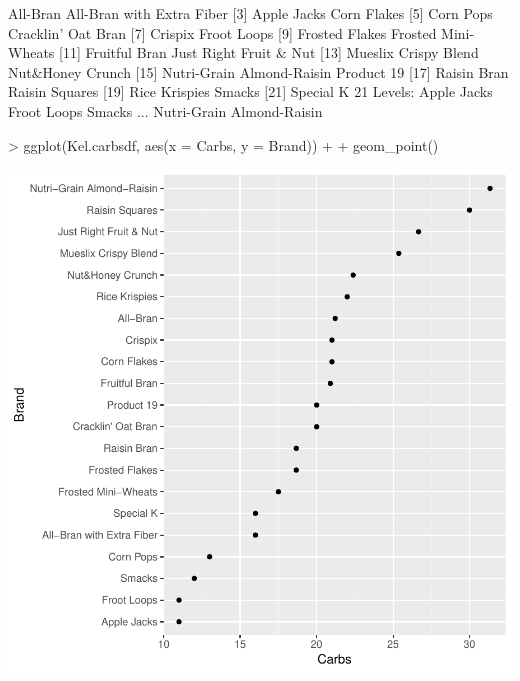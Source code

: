 \documentclass[12pt,letterpaper,final]{article}
\begin{document}
\begin{Schunk}
\begin{Soutput}
 [1] All-Bran                  All-Bran with Extra Fiber
 [3] Apple Jacks               Corn Flakes              
 [5] Corn Pops                 Cracklin' Oat Bran       
 [7] Crispix                   Froot Loops              
 [9] Frosted Flakes            Frosted Mini-Wheats      
[11] Fruitful Bran             Just Right Fruit & Nut   
[13] Mueslix Crispy Blend      Nut&Honey Crunch         
[15] Nutri-Grain Almond-Raisin Product 19               
[17] Raisin Bran               Raisin Squares           
[19] Rice Krispies             Smacks                   
[21] Special K                
21 Levels: Apple Jacks Froot Loops Smacks ... Nutri-Grain Almond-Raisin
\end{Soutput}
\begin{Sinput}
> ggplot(Kel.carbsdf, aes(x = Carbs, y = Brand)) +
+   geom_point()
\end{Sinput}
\end{Schunk}
\includegraphics{lect_main-023}
\end{document}
